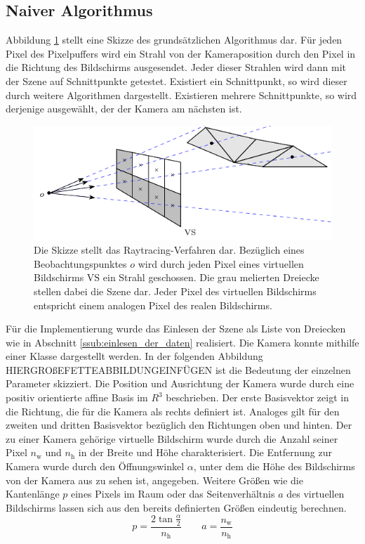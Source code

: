 \documentclass[crop=false]{standalone}
\begin{document}
    \subsection{Naiver Algorithmus} %
    \label{sub:naiver_algorithmus}
      Abbildung \ref{fig:raytracing} stellt eine Skizze des grundsätzlichen Algorithmus dar.
      Für jeden Pixel des Pixelpuffers wird ein Strahl von der Kameraposition durch den Pixel in die Richtung des Bildschirms ausgesendet.
      Jeder dieser Strahlen wird dann mit der Szene auf Schnittpunkte getestet.
      Existiert ein Schnittpunkt, so wird dieser durch weitere Algorithmen dargestellt.
      Existieren mehrere Schnittpunkte, so wird derjenige ausgewählt, der der Kamera am nächsten ist.
      \begin{figure}
        \center
        \includegraphics{images/ray_tracing_scheme.pdf}
        \caption{%
          Die Skizze stellt das Raytracing-Verfahren dar.
          Bezüglich eines Beobachtungspunktes $o$ wird durch jeden Pixel eines virtuellen Bildschirms $\mathrm{VS}$ ein Strahl geschossen.
          Die grau melierten Dreiecke stellen dabei die Szene dar.
          Jeder Pixel des virtuellen Bildschirms entspricht einem analogen Pixel des realen Bildschirms.
        }
        \label{fig:raytracing}
      \end{figure}

      Für die Implementierung wurde das Einlesen der Szene als Liste von Dreiecken wie in Abschnitt \ref{ssub:einlesen_der_daten} realisiert.
      Die Kamera konnte mithilfe einer Klasse dargestellt werden.
      In der folgenden Abbildung HIERGROßEFETTEABBILDUNGEINFÜGEN ist die Bedeutung der einzelnen Parameter skizziert.
      Die Position und Ausrichtung der Kamera wurde durch eine positiv orientierte affine Basis im $R^3$ beschrieben.
      Der erste Basisvektor zeigt in die Richtung, die für die Kamera als rechts definiert ist.
      Analoges gilt für den zweiten und dritten Basisvektor bezüglich den Richtungen oben und hinten.
      Der zu einer Kamera gehörige virtuelle Bildschirm wurde durch die Anzahl seiner Pixel $n_\mathrm{w}$ und $n_\mathrm{h}$ in der Breite und Höhe charakterisiert.
      Die Entfernung zur Kamera wurde durch den Öffnungswinkel $\alpha$, unter dem die Höhe des Bildschirms von der Kamera aus zu sehen ist, angegeben.
      Weitere Größen wie die Kantenlänge $p$ eines Pixels im Raum oder das Seitenverhältnis $a$ des virtuellen Bildschirms lassen sich aus den bereits definierten Größen eindeutig berechnen.
      \[
        p = \frac{2\tan \frac{\alpha}{2}}{n_\mathrm{h}}
        \qquad
        a = \frac{n_\mathrm{w}}{n_\mathrm{h}}
      \]
\end{document}
